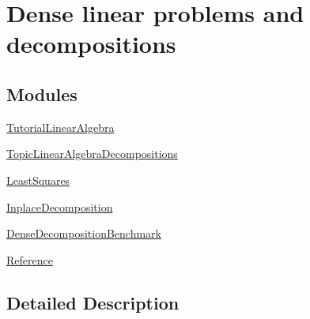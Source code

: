 \hypertarget{group___dense_linear_solvers__chapter}{}\section{Dense linear problems and decompositions}
\label{group___dense_linear_solvers__chapter}
\subsection*{Modules}
\begin{DoxyCompactItemize}
\item 
\hyperlink{group___tutorial_linear_algebra}{Tutorial\+Linear\+Algebra}
\item 
\hyperlink{group___topic_linear_algebra_decompositions}{Topic\+Linear\+Algebra\+Decompositions}
\item 
\hyperlink{group___least_squares}{Least\+Squares}
\item 
\hyperlink{group___inplace_decomposition}{Inplace\+Decomposition}
\item 
\hyperlink{group___dense_decomposition_benchmark}{Dense\+Decomposition\+Benchmark}
\item 
\hyperlink{group___dense_linear_solvers___reference}{Reference}
\end{DoxyCompactItemize}


\subsection{Detailed Description}
